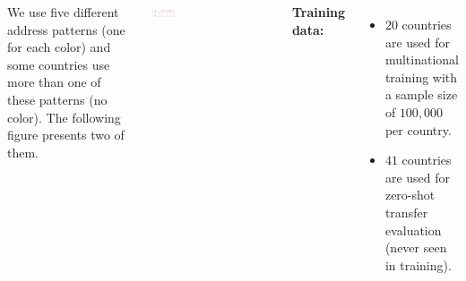 \documentclass[23pt, a0paper,
               colspace=10mm, subcolspace=0mm,
               blockverticalspace=12mm, landscape]{tikzposter} %
\begin{document}
\begin{columns}
{	We use five different address patterns (one for each color) and some countries use more than one of these patterns (no color). The following figure presents two of them.

	\includegraphics[width=0.2\textwidth,height=0.2\textheight,keepaspectratio]{figures/Samples3.png}
	
    \textbf{Training data:}
  \begin{itemize}
      \item $20$ countries are used for multinational training with a sample size of $100,000$ per country.
      \item $41$ countries are used for zero-shot transfer evaluation (never seen in training).
  \end{itemize}


  }
  
\end{columns}
\end{document}

